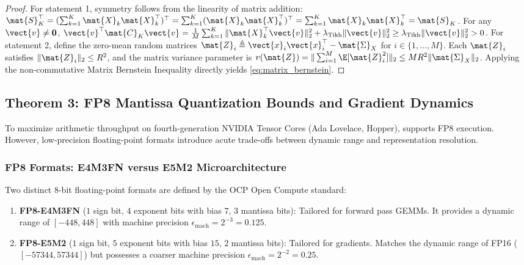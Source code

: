 \begin{proof}
For statement 1, symmetry follows from the linearity of matrix addition: $\mat{S}_K^\top = (\sum_{k=1}^K \mat{X}_k \mat{X}_k^\top)^\top = \sum_{k=1}^K (\mat{X}_k \mat{X}_k^\top)^\top = \sum_{k=1}^K \mat{X}_k \mat{X}_k^\top = \mat{S}_K$. For any $\vect{v} \neq \mathbf{0}$, $\vect{v}^\top \mat{C}_K \vect{v} = \frac{1}{M}\sum_{k=1}^K \|\mat{X}_k^\top \vect{v}\|_2^2 + \lambda_{\text{Tikh}} \|\vect{v}\|_2^2 \ge \lambda_{\text{Tikh}} \|\vect{v}\|_2^2 > 0$. For statement 2, define the zero-mean random matrices $\mat{Z}_i \triangleq \vect{x}_i \vect{x}_i^\top - \mat{\Sigma}_X$ for $i \in \{1, \dots, M\}$. Each $\mat{Z}_i$ satisfies $\|\mat{Z}_i\|_2 \le R^2$, and the matrix variance parameter is $v(\mat{Z}) = \|\sum_{i=1}^M \E[\mat{Z}_i^2]\|_2 \le M R^2 \|\mat{\Sigma}_X\|_2$. Applying the non-commutative Matrix Bernstein Inequality \cite{tropp2012user} directly yields \eqref{eq:matrix_bernstein}.
\end{proof}

\subsection{Theorem 3: FP8 Mantissa Quantization Bounds and Gradient Dynamics}
\label{sec:thm_fp8_mantissa}

To maximize arithmetic throughput on fourth-generation NVIDIA Tensor Cores (Ada Lovelace, Hopper), \neuralops{} supports FP8 execution. However, low-precision floating-point formats introduce acute trade-offs between dynamic range and representation resolution.

\subsubsection{FP8 Formats: E4M3FN versus E5M2 Microarchitecture}
Two distinct 8-bit floating-point formats are defined by the OCP Open Compute standard:
\begin{enumerate}
    \item \textbf{FP8-E4M3FN} ($1$ sign bit, $4$ exponent bits with bias $7$, $3$ mantissa bits): Tailored for forward pass GEMMs. It provides a dynamic range of $[-448, 448]$ with machine precision $\epsilon_{\text{mach}} = 2^{-3} = 0.125$.
    \item \textbf{FP8-E5M2} ($1$ sign bit, $5$ exponent bits with bias $15$, $2$ mantissa bits): Tailored for gradients. Matches the dynamic range of FP16 ($[-57344, 57344]$) but possesses a coarser machine precision $\epsilon_{\text{mach}} = 2^{-2} = 0.25$.
\end{enumerate}


